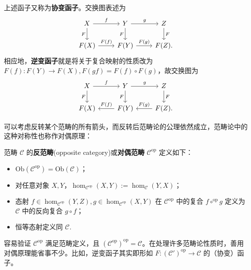 上述函子又称为\textbf{协变函子}。交换图表述为
\[\begin{tikzcd}
    X \arrow[r, "f"] \arrow[d, "F"'] & Y \arrow[r, "g"] \arrow[d, "F"'] & Z \arrow[d, "F"]\\
    F(X) \arrow[r, "F(f)"] & F(Y) \arrow[r, "F(g)"] & F(Z).
\end{tikzcd}\]
相应地，\textbf{逆变函子}就是将关于复合映射的性质改为 $F(f):F(Y)\to F(X),F(gf) = F(f) \circ F(g)$，故交换图为
\[\begin{tikzcd}
    X \arrow[r, "f"] \arrow[d, "F"'] & Y \arrow[r, "g"] \arrow[d, "F"'] & Z \arrow[d, "F"]\\
    F(X) & \arrow[l, "F(f)"'] F(Y) & \arrow[l, "F(g)"'] F(Z).
\end{tikzcd}\]

可以考虑反转某个范畴的所有箭头，而反转后范畴论的公理依然成立，范畴论中的这种对称性也称作对偶原理：
\begin{definition}
    范畴 $\mathcal{C}$ 的\textbf{反范畴}(opposite category)或\textbf{对偶范畴} $\mathcal{C}^\mathrm{op}$ 定义如下：
    \begin{itemize}
        \item $\mathrm{Ob}(\mathcal{C}^{\mathrm{op}}) = \mathrm{Ob}(\mathcal{C})$；
        \item 对任意对象 $X, Y$，$\hom_{\mathcal{C}^{\mathrm{op}}}(X, Y) := \hom_{\mathcal{C}}(Y, X)$；
        \item 态射 $f \in \hom_{\mathcal{C}^{\mathrm{op}}}(Y, Z), g \in \hom_{\mathcal{C}^{\mathrm{op}}}(X, Y)$ 在 $\mathcal{C}^{\mathrm{op}}$ 中的复合 $f \circ^\mathrm{op} g$ 定义为 $\mathcal{C}$ 中的反向复合 $g \circ f$；
        \item 恒等态射定义同 $\mathcal{C}$.
    \end{itemize}
\end{definition}
容易验证 $\mathcal{C}^\text{op}$ 满足范畴定义，且 $(\mathcal{C}^\text{op})^{\text{op}} = \mathcal{C}$。在处理许多范畴论性质时，善用对偶原理能省事不少。比如，逆变函子其实即形如 $F: (\mathcal{C}')^\text{op} \to \mathcal{C}$ 的（协变）函子。

